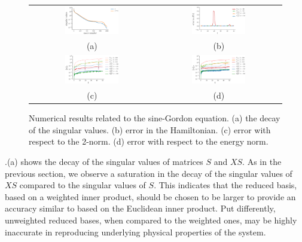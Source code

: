 \begin{figure} 
\begin{tabular}{cc}
\includegraphics[width=0.45\textwidth]{./images/paper2/sine/singulars} & \includegraphics[width=0.45\textwidth]{./images/paper2/sine/energy} \\
(a) & (b) \\
\includegraphics[width=0.45\textwidth]{./images/paper2/sine/l2} & \includegraphics[width=0.45\textwidth]{./images/paper2/sine/energy_norm} \\
(c) & (d) \\
\end{tabular}
\caption{Numerical results related to the sine-Gordon equation. (a) the decay of the singular values. (b) error in the Hamiltonian. (c) error with respect to the 2-norm. (d) error with respect to the energy norm.} \label{fig:2}
\end{figure}

.(a) shows the decay of the singular values of matrices $S$ and $XS$. As in the previous section, we observe a saturation in the decay of the singular values of $XS$ compared to the singular values of $S$. This indicates that the reduced basis, based on a weighted inner product, should be chosen to be larger to provide an accuracy similar to based on the Euclidean inner product. Put differently, unweighted reduced bases, when compared to the weighted ones, may be highly inaccurate in reproducing underlying physical properties of the system.


